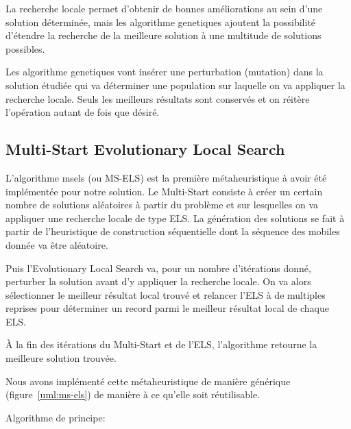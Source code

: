 		La recherche locale permet d'obtenir de bonnes améliorations au sein d'une solution déterminée, mais les \glspl{algorithme genetique} ajoutent la possibilité d'étendre la recherche de la meilleure solution à une multitude de solutions possibles.

		Les \glspl{algorithme genetique} vont insérer une perturbation (mutation) dans la solution étudiée qui va déterminer une population sur laquelle on va appliquer la recherche locale. Seuls les meilleurs résultats sont conservés et on réitère l'opération autant de fois que désiré.

		\subsection{Multi-Start Evolutionary Local Search}

			L'algorithme \acrlong{msels} (ou MS-ELS) est la première métaheuristique à avoir été implémentée pour notre solution. Le Multi-Start consiste à créer un certain nombre de solutions aléatoires à partir du problème et sur lesquelles on va appliquer une recherche locale de type ELS. La génération des solutions se fait à partir de l'heuristique de construction séquentielle dont la séquence des mobiles donnée va être aléatoire.

			Puis l'Evolutionary Local Search va, pour un nombre d'itérations donné, perturber la solution avant d'y appliquer la recherche locale. On va alors sélectionner le meilleur résultat local trouvé et relancer l'ELS à de multiples reprises pour déterminer un record parmi le meilleur résultat local de chaque ELS.

			À la fin des itérations du Multi-Start et de l'ELS, l'algorithme retourne la meilleure solution trouvée.

			Nous avons implémenté cette métaheuristique de manière générique (figure~\ref{uml:ms-els}) de manière à ce qu'elle soit réutilisable.

			Algorithme de principe:
			\begin{code}
				\begin{algo}[informal]
					\BEGIN
									\ENDIF
								\ENDFOR
								\ENDIF
							\ENDFOR
						\ENDFOR
					\END
				\end{algo}
			\end{code}
			\newpage

